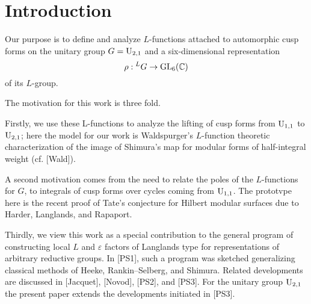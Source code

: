 \section*{Introduction}
\label{sec:intro}

Our purpose is to define and analyze $L$-functions attached to automorphic
cusp forms on the unitary group $G = \mathrm{U}_{2, 1}$ and a six-dimensional representation
\[
    \rho: {}^L G \to \mathrm{GL}_6(\mathbb{C})
\]
of its $L$-group.

The motivation for this work is three fold.


Firstly, we use these L-functions to analyze the lifting of cusp forms
from $\mathrm{U}_{1, 1}$ to $\mathrm{U}_{2, 1}$; here the model for our work is Waldspurger's $L$-function theoretic characterization of the image of Shimura's map for modular forms of half-integral weight (cf. [Wald]).

A second motivation comes from the need to relate the poles of the $L$-functions for $G$, to integrals of cusp forms over cycles coming from $\mathrm{U}_{1, 1}$.
The prototvpe here is the recent proof of Tate's conjecture for Hilbert modular surfaces due to Harder, Langlands, and Rapaport.

Thirdly, we view this work as a special contribution to the general program of constructing local $L$ and $\varepsilon$ factors of Langlands type for representations of arbitrary reductive groups.
In [PS1], such a program was sketched generalizing classical methods of Heeke, Rankin--Selberg, and Shimura.
Related developments are discussed in [Jacquet], [Novod], [PS2], and [PS3].
For the unitary group $\mathrm{U}_{2, 1}$ the present paper extends the developments initiated in [PS3].